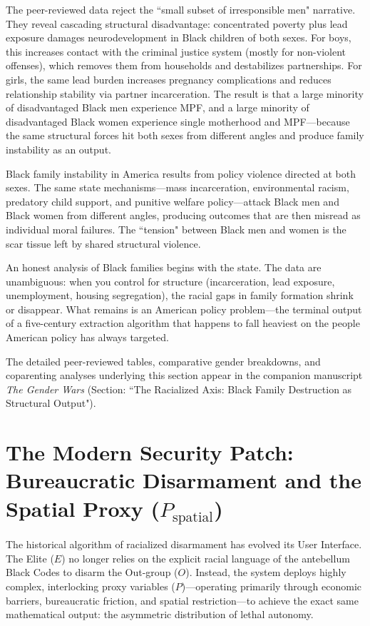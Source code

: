 The peer-reviewed data reject the ``small subset of irresponsible men" narrative. They reveal cascading structural disadvantage: concentrated poverty plus lead exposure damages neurodevelopment in Black children of both sexes. For boys, this increases contact with the criminal justice system (mostly for non-violent offenses), which removes them from households and destabilizes partnerships. For girls, the same lead burden increases pregnancy complications and reduces relationship stability via partner incarceration. The result is that a large minority of disadvantaged Black men experience MPF, and a large minority of disadvantaged Black women experience single motherhood and MPF---because the same structural forces hit both sexes from different angles and produce family instability as an output.

Black family instability in America results from policy violence directed at both sexes. The same state mechanisms---mass incarceration, environmental racism, predatory child support, and punitive welfare policy---attack Black men and Black women from different angles, producing outcomes that are then misread as individual moral failures. The ``tension" between Black men and women is the scar tissue left by shared structural violence.

An honest analysis of Black families begins with the state. The data are unambiguous: when you control for structure (incarceration, lead exposure, unemployment, housing segregation), the racial gaps in family formation shrink or disappear. What remains is an American policy problem---the terminal output of a five-century extraction algorithm that happens to fall heaviest on the people American policy has always targeted.

The detailed peer-reviewed tables, comparative gender breakdowns, and coparenting analyses underlying this section appear in the companion manuscript \textit{The Gender Wars} (Section: ``The Racialized Axis: Black Family Destruction as Structural Output").

\section{The Modern Security Patch: Bureaucratic Disarmament and the Spatial Proxy (\texorpdfstring{$P_{\text{spatial}}$}{P\_spatial})}

The historical algorithm of racialized disarmament has evolved its User Interface. The Elite ($E$) no longer relies on the explicit racial language of the antebellum Black Codes to disarm the Out-group ($O$). Instead, the system deploys highly complex, interlocking proxy variables ($P$)---operating primarily through economic barriers, bureaucratic friction, and spatial restriction---to achieve the exact same mathematical output: the asymmetric distribution of lethal autonomy.

